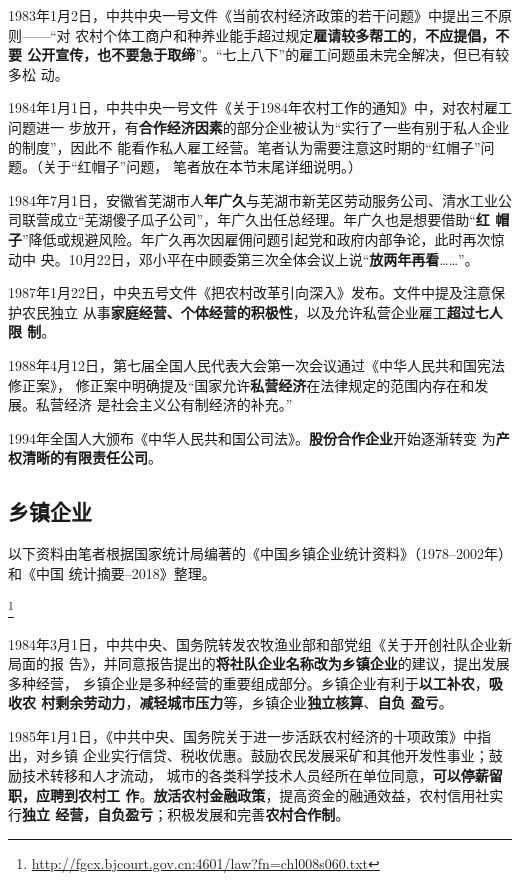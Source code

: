 1983年1月2日，中共中央一号文件《当前农村经济政策的若干问题》中提出三不原则——“对
农村个体工商户和种养业能手超过规定\textbf{雇请较多帮工的}，\textbf{不应提倡，不要
  公开宣传，也不要急于取缔}”。“七上八下”的雇工问题虽未完全解决，但已有较多松
动。

1984年1月1日，中共中央一号文件《关于1984年农村工作的通知》中，对农村雇工问题进一
步放开，有\textbf{合作经济因素}的部分企业被认为“实行了一些有别于私人企业的制度”，因此不
能看作私人雇工经营。笔者认为需要注意这时期的“红帽子”问题。（关于“红帽子”问题，
笔者放在本节末尾详细说明。）

1984年7月1日，安徽省芜湖市人\textbf{年广久}与芜湖市新芜区劳动服务公司、清水工业公
司联营成立“芜湖傻子瓜子公司”，年广久出任总经理。年广久也是想要借助“\textbf{红
  帽子}”降低或规避风险。年广久再次因雇佣问题引起党和政府内部争论，此时再次惊动中
央。10月22日，邓小平在中顾委第三次全体会议上说“\textbf{放两年再看}……”。

1987年1月22日，中央五号文件《把农村改革引向深入》发布。文件中提及注意保护农民独立
从事\textbf{家庭经营、个体经营的积极性}，以及允许私营企业雇工\textbf{超过七人限
  制}。

1988年4月12日，第七届全国人民代表大会第一次会议通过《中华人民共和国宪法修正案》，
修正案中明确提及“国家允许\textbf{私营经济}在法律规定的范围内存在和发展。私营经济
是社会主义公有制经济的补充。”

1994年全国人大颁布《中华人民共和国公司法》。\textbf{股份合作企业}开始逐渐转变
为\textbf{产权清晰的有限责任公司}。

\subsection{乡镇企业}

以下资料由笔者根据国家统计局编著的《中国乡镇企业统计资料》（1978--2002年）和《中国
统计摘要--2018》整理。



\footnote{\url{http://fgcx.bjcourt.gov.cn:4601/law?fn=chl008s060.txt}}

1984年3月1日，中共中央、国务院转发农牧渔业部和部党组《关于开创社队企业新局面的报
告》，并同意报告提出的\textbf{将社队企业名称改为乡镇企业}的建议，提出发展多种经营，
乡镇企业是多种经营的重要组成部分。乡镇企业有利于\textbf{以工补农}，\textbf{吸收农
  村剩余劳动力}，\textbf{减轻城市压力}等，乡镇企业\textbf{独立核算}、\textbf{自负
  盈亏}。

1985年1月1日，《中共中央、国务院关于进一步活跃农村经济的十项政策》中指出，对乡镇
企业实行信贷、税收优惠。鼓励农民发展采矿和其他开发性事业；鼓励技术转移和人才流动，
城市的各类科学技术人员经所在单位同意，\textbf{可以停薪留职，应聘到农村工
  作}。\textbf{放活农村金融政策}，提高资金的融通效益，农村信用社实行\textbf{独立
  经营，自负盈亏}；积极发展和完善\textbf{农村合作制}。

